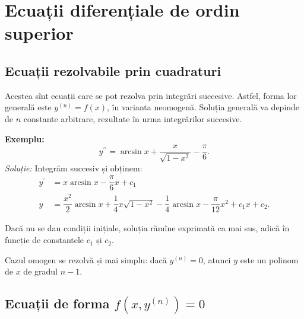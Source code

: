 
\chapter{Ecuații diferențiale de ordin superior}

\section{Ecuații rezolvabile prin cuadraturi}

\indent\indent Acestea sînt ecuații care se pot rezolva prin integrări
succesive. Astfel, forma lor generală este $ y^{(n)} = f(x) $, în varianta
neomogenă. Soluția generală va depinde de $ n $ constante arbitrare,
rezultate în urma integrărilor succesive.

\textbf{Exemplu:}
\[
  y^{\prime\prime} = \arcsin x + \frac{x}{\sqrt{1 - x^2}} - \frac{\pi}{6}.
\]
\emph{Soluție:} Integrăm succesiv și obținem:
\begin{align*}
  y^{\prime} &= x \arcsin x - \dfrac{\pi}{6} x + c_1 \\
  y &= \dfrac{x^2}{2} \arcsin x + \dfrac{1}{4}x \sqrt{1 - x^2} - %
  \dfrac{1}{4} \arcsin x - \dfrac{\pi}{12} x^2 + c_1 x + c_2.
\end{align*}

Dacă nu se dau condiții inițiale, soluția rămîne exprimată ca mai sus,
adică în funcție de constantele $ c_1 $ și $ c_2 $.

\vspace{1cm}

Cazul omogen se rezolvă și mai simplu: dacă $ y^{(n)} = 0 $, atunci
$ y $ este un polinom de $ x $ de gradul $ n - 1 $.


\section{Ecuații de forma $ f(x, y^{(n)}) = 0 $}

